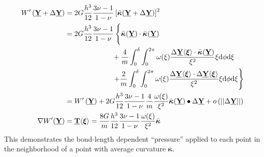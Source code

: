\documentclass[preprint,review,12pt]{elsarticle}
\newcommand\vstate[3]{%
	\mathbf{\underline{#1}}%
	\ifstrempty{#2}{}{[#2]}%
	\ifstrempty{#3}{}{\langle #3 \rangle}}
\begin{document}
\begin{align}
    W'\left(\vstate{Y}{}{}+\Delta\vstate{Y}{}{}\right) &=2G\frac{h^3}{12}\frac{3\nu-1}{1-\nu}\left[\bar{\boldsymbol{\kappa}}\!\left(\vstate{Y}{}{}+\Delta\vstate{Y}{}{}\right)\right]^2 \notag \\
    &=2G\frac{h^3}{12}\frac{3\nu-1}{1-\nu} \left\{ \vphantom{\int_0^\delta} \bar{\boldsymbol{\kappa}}\!\left(\vstate{Y}{}{}\right) \cdot \bar{\boldsymbol{\kappa}}\!\left(\vstate{Y}{}{}\right)\right. \notag \\
    &\phantom{=2G\frac{h^3}{12}\frac{3\nu-1}{1-\nu}} + \frac{4}{m} \int_0^\delta \int_0^{2\pi}\omega(\xi)\frac{\Delta\vstate{Y}{}{\boldsymbol{\xi}}\cdot \bar{\boldsymbol{\kappa}}\!\left(\vstate{Y}{}{}\right)}{\xi^2} \xi {\rm d}\phi {\rm d}\xi \notag \\
    &\phantom{=2G\frac{h^3}{12}\frac{3\nu-1}{1-\nu}}\left. + \frac{2}{m} \int_0^\delta \int_0^{2\pi}\omega(\xi)\frac{\Delta\vstate{Y}{}{\boldsymbol{\xi}}\cdot \Delta\vstate{Y}{}{\boldsymbol{\xi}}}{\xi^2} \xi {\rm d}\phi {\rm d}\xi\right\} \notag \\
    &=W'\left(\vstate{Y}{}{}\right)+ 2G\frac{h^3}{12}\frac{3\nu-1}{1-\nu} \frac{4}{m} \frac{\omega(\xi)}{\xi^2} \bar{\boldsymbol{\kappa}}\!\left(\vstate{Y}{}{}\right) \bullet \Delta\vstate{Y}{}{} + o\left(||\Delta\vstate{Y}{}{}||\right)\notag \\
    \nabla W'\!\left(\vstate{Y}{}{}\right) &= \vstate{T}{}{\boldsymbol{\xi}} =  \frac{8 G}{m} \frac{h^3}{12}\frac{3\nu-1}{1-\nu}\frac{\omega(\xi)}{\xi^2} \bar{\boldsymbol{\kappa}}\notag
\end{align}
%
This demonstrates the bond-length dependent ``pressure'' applied to each point in the neighborhood of a point with average curvature $\bar{\boldsymbol{\kappa}}$.




\end{document}

